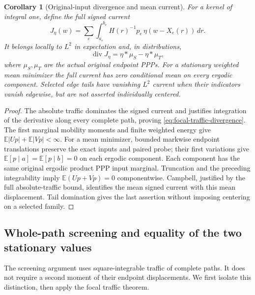 \documentclass[11pt,reqno]{amsart}
\newtheorem{corollary}[theorem]{Corollary}
\theoremstyle{definition}
\theoremstyle{remark}
\numberwithin{equation}{section}
\newcommand{\E}{\mathbb E}
\begin{document}
\begin{corollary}[Original-input divergence and mean current]
\label{cor:focal-traffic-current}
For a kernel of integral one, define the full signed current
\[
 J_\eta(w)=\sum_e\int_{a_e}^{b_e}
                 H(r)^{-1}p_e\,\eta(w-X_e(r))\,dr.
\]
It belongs locally to $L^2$ in expectation and, in distributions,
\begin{equation}\label{eq:focal-traffic-divergence}
 \operatorname{div}J_\eta=\eta*\mu_S-\eta*\mu_T,
\end{equation}
where $\mu_S,\mu_T$ are the actual original endpoint PPPs.
For a stationary weighted mean minimizer the full current has zero
conditional mean on every ergodic component. Selected edge tails
have vanishing $L^2$ current when their indicators vanish edgewise,
but are not asserted individually centered.
\end{corollary}
\begin{proof}
The absolute traffic dominates the signed current and justifies
integration of the derivative along every complete path, proving
\eqref{eq:focal-traffic-divergence}. The first marginal mobility moments
and finite weighted energy give $\E|Up|+\E|Vp|<\infty$.
For a mean minimizer, bounded markwise endpoint translations preserve
the exact inputs and paired probe; their first variations give
$\E[p\mid a]=\E[p\mid b]=0$ on each ergodic component. Each component
has the same original ergodic product PPP input marginal. Truncation
and the preceding integrability imply $\E(Up+Vp)=0$ componentwise.
Campbell, justified by the full absolute-traffic bound, identifies
the mean signed current with this mean displacement. Tail domination
gives the last assertion without imposing centering on a selected
family.
\end{proof}

\subsection{Whole-path screening and equality of the two stationary values}
\label{subsec:general-path-weighted-screening}

The screening argument uses square-integrable traffic of complete paths.
It does not require a second moment of their endpoint displacements.
We first isolate this distinction, then apply the focal traffic theorem.
\end{document}
